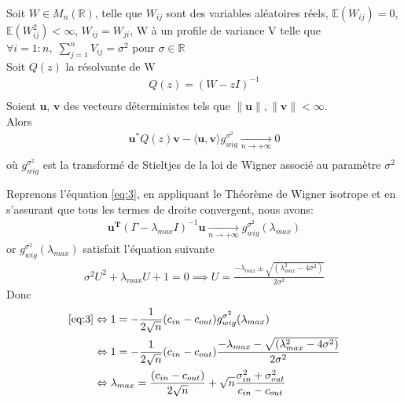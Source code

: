 \begin{theorem}
Soit $W \in M_{n}(\mathbb{R})$, telle que $W_{ij}$ sont des variables aléatoires réels, $\mathbb{E}(W_{ij}) = 0$, $\mathbb{E}(W_{ij}^2) < \infty$, $W_{ij} = W_{ji}$, W à un profile de variance V telle que $\forall i = 1:n , \; \sum_{j=1}^{n}V_{ij} = \sigma^2$ pour $\sigma \in \mathbb{R}$\\
Soit $Q(z)$ la résolvante de W
\begin{align*} 
Q(z) = (W - zI)^{-1}\\
\end{align*}
Soient $\mathbf{u}$, $\mathbf{v}$ des vecteurs déterministes tels que $\|\mathbf{u}\|, \|\mathbf{v}\| < \infty$.\\
Alors 
\begin{align*} 
\mathbf{u}^*Q(z)\mathbf{v} - \langle \mathbf{u}, \mathbf{v} \rangle g_{wig}^{\sigma^2} \xrightarrow[n \to +\infty]{} 0\\
\end{align*}
où $g_{wig}^{\sigma^2}$ est la transformé de Stieltjes de la loi de Wigner associé au paramètre $\sigma^2$\\
\end{theorem}

Reprenons l’équation \eqref{eq:3}, en appliquant le Théorème de Wigner isotrope et en s'assurant que tous les termes de droite convergent, nous avons:
\begin{align*}
\mathbf{u^T}(\Gamma - \lambda_{max}I)^{-1}\mathbf{u} \xrightarrow[n \to +\infty]{} g_{wig}^{\sigma^2}(\lambda_{max})
\end{align*}
or $g_{wig}^{\sigma^2}(\lambda_{max})$ satisfait l'équation suivante 
\begin{align}
	\sigma^2U^2+\lambda_{max}U+1=0 \implies U = \frac{- \lambda_{max} \pm \sqrt{(\lambda_{max}^2 - 4\sigma^2)}}{2\sigma^2}
\end{align}
Donc
\begin{align}
	\eqref{eq:3} &\Leftrightarrow1 = -\frac{1}{2\sqrt{n}}(c_{in} - c_{out}) g_{wig}^{\sigma^2}(\lambda_{max}) \nonumber\\
	&\Leftrightarrow 1 = -\frac{1}{2\sqrt{n}}(c_{in} - c_{out}) \frac{- \lambda_{max} - \sqrt{(\lambda_{max}^2 - 4\sigma^2)}}{2\sigma^2} \nonumber\\
	&\Leftrightarrow \lambda_{max} = \frac{(c_{in} - c_{out})}{2\sqrt{n}} + \sqrt{n}\frac{\sigma_{in}^2 + \sigma_{out}^2}{c_{in} - c_{out}} \label{z1}
\end{align}

